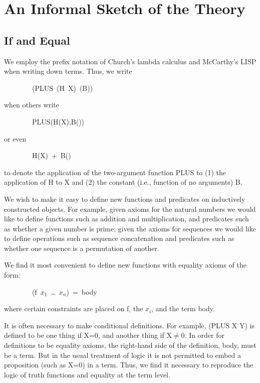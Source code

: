 \documentclass[10pt]{book}
\newenvironment{pubasis}{\begin{flushleft}}{\end{flushleft}}
\begin{document}
\section{An Informal Sketch of the Theory}
\subsection{If and Equal}
We employ the prefix notation of Church's lambda calculus \cite{CHURCHLAMBDA}
and McCarthy's LISP \cite{LISPMANUAL} when writing down terms.  Thus,
we write
\begin{pubasis}
~~~~~~~~(PLUS~(H~X)~(B))\\
\end{pubasis}
when others write
\begin{pubasis}
~~~~~~~~PLUS(H(X),B())\\
\end{pubasis}
or even
\begin{pubasis}
~~~~~~~~H(X)~+~B()\\
\end{pubasis}
to denote the application of the two-argument function PLUS to (1) the
application of H to X and (2) the constant (i.e., function of no arguments) B.

We wish to make it easy to define new functions and predicates on
inductively constructed objects.
For example, given axioms for the natural numbers we would like
to define functions such as addition and multiplication, and
predicates such as whether a given number is prime; given the axioms
for sequences we would like to define operations such as sequence concatenation
and predicates such as whether one sequence is a permutation of
another.

We find it most convenient to define new functions with equality axioms of the form:
\begin{pubasis}
~~~~~~~~(f~$x_{1}$~\ldots{}~$x_{n}$)~=~body~\\
\end{pubasis}
where certain constraints are placed on f, the $x_{i}$, and the term body.

It is often necessary to make conditional definitions.
For example,
(PLUS X Y) is defined to be one thing if X=0,  and another thing
if X$\neq$0.
In order for definitions to be equality axioms, the right-hand
side of the definition, body, must be a term.
But in the usual treatment of logic it is not
permitted to embed a proposition (such as X=0) in a term.
Thus, we find it necessary to reproduce the logic of truth functions
and equality at the term level.
\end{document}
